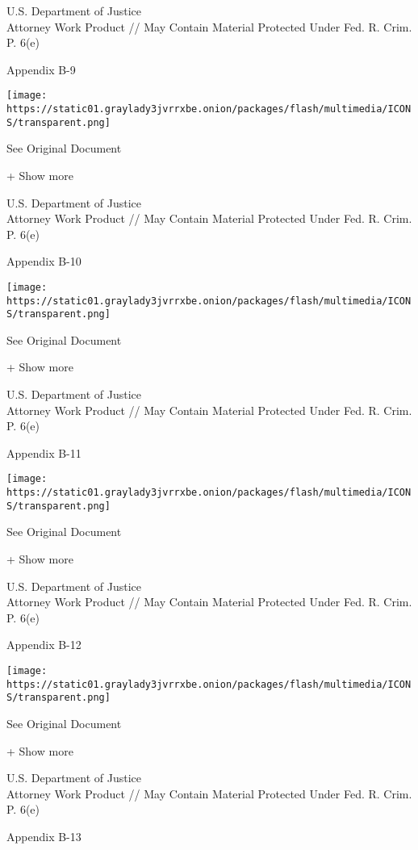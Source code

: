 U.S. Department of Justice\\
Attorney Work Product // May Contain Material Protected Under Fed. R.
Crim. P. 6(e)

Appendix B-9

\protect\hyperlink{}{}

\texttt{[image: https://static01.graylady3jvrrxbe.onion/packages/flash/multimedia/ICONS/transparent.png]}

See Original Document

+ Show more

U.S. Department of Justice\\
Attorney Work Product // May Contain Material Protected Under Fed. R.
Crim. P. 6(e)

Appendix B-10

\protect\hyperlink{}{}

\texttt{[image: https://static01.graylady3jvrrxbe.onion/packages/flash/multimedia/ICONS/transparent.png]}

See Original Document

+ Show more

U.S. Department of Justice\\
Attorney Work Product // May Contain Material Protected Under Fed. R.
Crim. P. 6(e)

Appendix B-11

\protect\hyperlink{}{}

\texttt{[image: https://static01.graylady3jvrrxbe.onion/packages/flash/multimedia/ICONS/transparent.png]}

See Original Document

+ Show more

U.S. Department of Justice\\
Attorney Work Product // May Contain Material Protected Under Fed. R.
Crim. P. 6(e)

Appendix B-12

\protect\hyperlink{}{}

\texttt{[image: https://static01.graylady3jvrrxbe.onion/packages/flash/multimedia/ICONS/transparent.png]}

See Original Document

+ Show more

U.S. Department of Justice\\
Attorney Work Product // May Contain Material Protected Under Fed. R.
Crim. P. 6(e)

Appendix B-13

\protect\hyperlink{}{}

